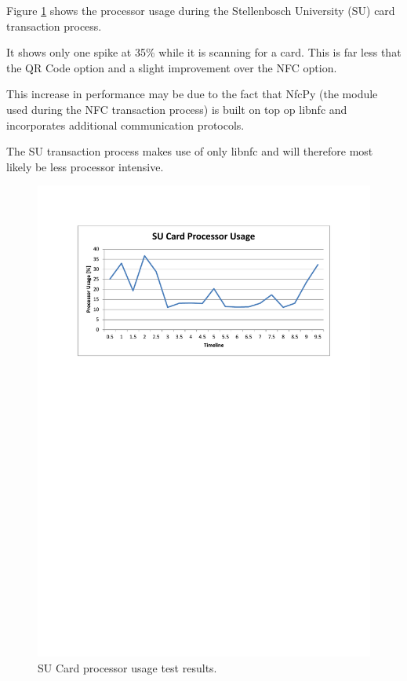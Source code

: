 Figure \ref{fig:su_test_cpu} shows the processor usage during the Stellenbosch University
(SU) card transaction process. 

It shows only one spike at 35\% while it is scanning for a card. This is far less that the
QR Code option and a slight improvement over the NFC option. 

This increase in performance may be due to the fact that NfcPy (the module used during the
NFC transaction process) is built on top op libnfc and incorporates additional
communication protocols.

The SU transaction process makes use of only libnfc and will therefore most likely be less
processor intensive.

\begin{figure}
 \centering 
 \includegraphics[clip=true, trim = 0 530 0 70,
 scale=0.7]{su_test_cpu}
 \caption{SU Card processor usage test results.}
 \label{fig:su_test_cpu}
\end{figure}

